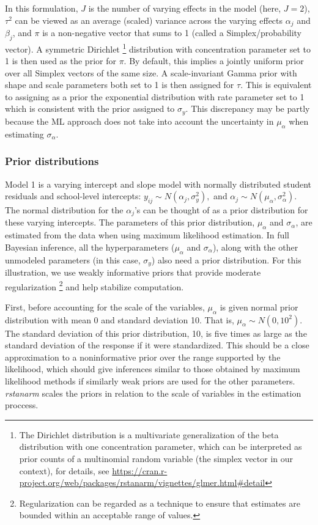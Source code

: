 In this formulation, $J$ is the number of varying effects in the model (here, $J=2$), $\tau^2$ can be viewed as an average (scaled) variance across the varying effects $\alpha_j$ and $\beta_j$, and $\pi$ is a non-negative vector that sums to 1 (called a Simplex/probability vector).  A symmetric Dirichlet \footnote{The Dirichlet distribution is a multivariate generalization of the beta distribution with one concentration parameter, which can be interpreted as prior counts of a multinomial random variable (the simplex vector in our context), for details, see \url{https://cran.r-project.org/web/packages/rstanarm/vignettes/glmer.html\#detail}} distribution with concentration parameter set to 1 is then used as the prior for $\pi$.  By default, this implies a jointly uniform prior over all Simplex vectors of the same size.  A scale-invariant Gamma prior with shape and scale parameters both set to 1 is then assigned for $\tau$.  This is equivalent to assigning as a prior the exponential distribution with rate parameter set to 1 which is consistent with the prior assigned to $\sigma_y$. 
This discrepancy may be partly because the ML approach does not take into account the uncertainty in $\mu_{\alpha}$ when estimating $\sigma_{\alpha}$.

\subsubsection*{Prior distributions}
Model 1 is a varying intercept and slope model with normally distributed student residuals and school-level intercepts: $y_{ij} \sim N(\alpha_{j}, \sigma_{y}^{2}),$ and $\alpha_{j}\sim N(\mu_{\alpha}, \sigma_{\alpha}^{2})$. The normal distribution for the $\alpha_{j}$'s can be thought of as a prior distribution for these varying intercepts. The parameters of this prior distribution, $\mu_{\alpha}$ and $\sigma_{\alpha}$, are estimated from the data when using maximum likelihood estimation. In full Bayesian inference, all the hyperparameters ($\mu_{\alpha}$ and $\sigma_{\alpha}$), along with the other unmodeled parameters (in this case, $\sigma_{y}$) also need a prior distribution. For this illustration, we use weakly informative priors that provide moderate regularization \footnote{Regularization can be regarded as a technique to ensure that estimates are bounded within an acceptable range of values.} and help stabilize computation.

First, before accounting for the scale of the variables, $\mu_{\alpha}$ is given normal prior distribution with mean 0 and standard deviation 10.  That is, $\mu_{\alpha} \sim N(0, 10^2)$. The standard deviation of this prior distribution, 10, is five times as large as the standard deviation of the response if it were standardized. This should be a close approximation to a noninformative prior over the range supported by the likelihood, which should give inferences similar to those obtained by maximum likelihood methods if similarly weak priors are used for the other parameters. \textit{rstanarm} scales the priors in relation to the scale of variables in the estimation proccess.

